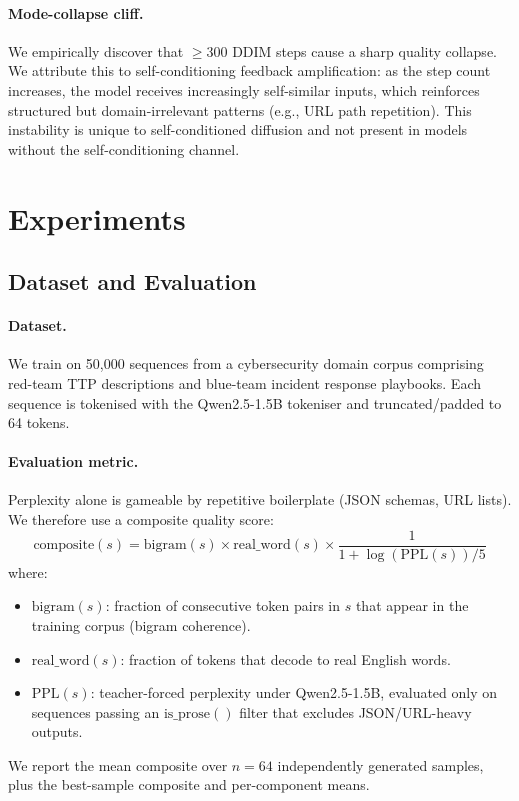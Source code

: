 \documentclass[11pt,a4paper]{article}
\begin{document}
\paragraph{Mode-collapse cliff.}
We empirically discover that $\geq 300$ DDIM steps cause a sharp quality collapse.
We attribute this to self-conditioning feedback amplification: as the step count
increases, the model receives increasingly self-similar inputs, which reinforces
structured but domain-irrelevant patterns (e.g., URL path repetition).
This instability is unique to self-conditioned diffusion and not present in models
without the self-conditioning channel.


\section{Experiments}
\label{sec:experiments}

\subsection{Dataset and Evaluation}
\label{sec:eval}

\paragraph{Dataset.}
We train on 50{,}000 sequences from a cybersecurity domain corpus comprising
red-team TTP descriptions and blue-team incident response playbooks.
Each sequence is tokenised with the Qwen2.5-1.5B tokeniser and truncated/padded
to 64 tokens.

\paragraph{Evaluation metric.}
Perplexity alone is gameable by repetitive boilerplate (JSON schemas, URL lists).
We therefore use a composite quality score:
\begin{equation}
  \text{composite}(s) = \text{bigram}(s) \times \text{real\_word}(s) \times \frac{1}{1 + \log(\text{PPL}(s))/5}
  \label{eq:composite}
\end{equation}
where:
\begin{itemize}[leftmargin=1.5em, itemsep=1pt]
  \item $\text{bigram}(s)$: fraction of consecutive token pairs in $s$ that appear in
    the training corpus (bigram coherence).
  \item $\text{real\_word}(s)$: fraction of tokens that decode to real English words.
  \item $\text{PPL}(s)$: teacher-forced perplexity under Qwen2.5-1.5B, evaluated only
    on sequences passing an $\text{is\_prose}()$ filter that excludes JSON/URL-heavy outputs.
\end{itemize}
We report the mean composite over $n=64$ independently generated samples, plus the
best-sample composite and per-component means.
\end{document}

